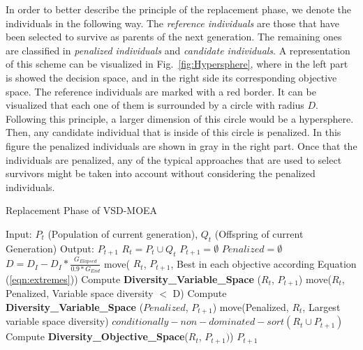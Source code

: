In order to better describe the principle of the replacement phase, we denote the individuals in the following way.
%
The \textit{reference individuals} are those that have been selected to survive as parents of the next generation. 
%
The remaining ones are classified in \textit{penalized individuals} and \textit{candidate individuals}.
%
A representation of this scheme can be visualized in Fig.~\ref{fig:Hypersphere}, where in the left part is showed the decision space, and in the right side its corresponding objective space.
%
The reference individuals are marked with a red border.
%
It can be visualized that each one of them is surrounded by a circle with radius $D$.
%
Following this principle, a larger dimension of this circle would be a hypersphere.
%
Then, any candidate individual that is inside of this circle is penalized.
%
In this figure the penalized individuals are shown in gray in the right part.
%
Once that the individuals are penalized, any of the typical approaches that are used to select survivors might be taken into account without considering the penalized individuals.


\begin{algorithm}[t]
  \scriptsize
	\caption{Replacement Phase of VSD-MOEA} 
\begin{algorithmic}[1]
\STATE Input: $P_t$ (Population of current generation), $Q_t$ (Offspring of current Generation)
    	\STATE Output: $P_{t+1}$ 
        \STATE $R_t = P_t \cup Q_t$ \label{alg:1}
        \STATE $P_{t+1} = \emptyset$ \label{alg:2}
        \STATE $Penalized = \emptyset$ \label{alg:3}
				\STATE $D = D_I - D_I * \frac{G_{Elapsed}}{0.9*G_{End}}$ \label{alg:4}
		\STATE move( $R_t$,  $P_{t+1}$, Best in each objective according Equation (\ref{eqn:extremes})) \label{alg:5}
         \label{alg:6}
			\STATE Compute \textbf{Diversity\_Variable\_Space} ($R_t$, $P_{t+1}$) \label{alg:7}
		\STATE move($R_t$, Penalized, Variable space diversity $ < $ D)  \label{alg:8}
         \label{alg:9}
				\STATE Compute \textbf{Diversity\_Variable\_Space} ($Penalized$, $P_{t+1}$) \label{alg:10}
				\STATE move(Penalized, $R_t$, Largest variable space diversity) \label{alg:11}
        \ENDIF
		\STATE $conditionally-non-dominated-sort(R_t \cup P_{t+1}) $ \label{alg:12}
		\STATE Compute \textbf{Diversity\_Objective\_Space}($R_t$, $P_{t+1})$) \label{alg:13}
        \ENDWHILE
    	\RETURN $P_{t+1}$ \label{alg:14}
	\end{algorithmic}
\label{alg:Replacement_Phase}
\end{algorithm}


